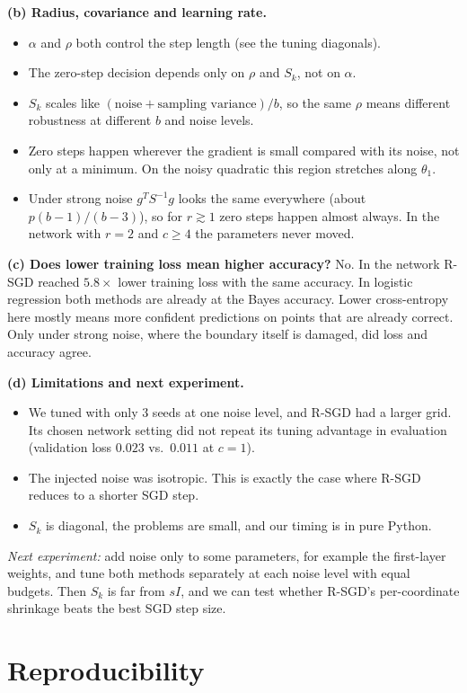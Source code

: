\documentclass[11pt,a4paper]{article}
\begin{document}
\textbf{(b) Radius, covariance and learning rate.}
\begin{itemize}
\item $\alpha$ and $\rho$ both control the step length (see the tuning diagonals).
\item The zero-step decision depends only on $\rho$ and $S_k$, not on $\alpha$.
\item $S_k$ scales like $(\text{noise}+\text{sampling variance})/b$, so the same $\rho$ means different
robustness at different $b$ and noise levels.
\item Zero steps happen wherever the gradient is small compared with its noise, not only at a minimum.
On the noisy quadratic this region stretches along $\theta_1$.
\item Under strong noise $g^TS^{-1}g$ looks the same everywhere (about $p(b-1)/(b-3)$), so for
$r\gtrsim1$ zero steps happen almost always. In the network with $r=2$ and $c\ge4$ the parameters never
moved.
\end{itemize}

\textbf{(c) Does lower training loss mean higher accuracy?} No. In the network R-SGD reached
$5.8\times$ lower training loss with the same accuracy. In logistic regression both methods are already
at the Bayes accuracy. Lower cross-entropy here mostly means more confident predictions on points that
are already correct. Only under strong noise, where the boundary itself is damaged, did loss and
accuracy agree.

\textbf{(d) Limitations and next experiment.}
\begin{itemize}
\item We tuned with only 3 seeds at one noise level, and R-SGD had a larger grid. Its chosen network
setting did not repeat its tuning advantage in evaluation (validation loss $0.023$ vs.\ $0.011$ at
$c=1$).
\item The injected noise was isotropic. This is exactly the case where R-SGD reduces to a shorter SGD
step.
\item $S_k$ is diagonal, the problems are small, and our timing is in pure Python.
\end{itemize}
\emph{Next experiment:} add noise only to some parameters, for example the first-layer weights, and
tune both methods separately at each noise level with equal budgets. Then $S_k$ is far from $sI$, and
we can test whether R-SGD's per-coordinate shrinkage beats the best SGD step size.

\section{Reproducibility}
\end{document}
